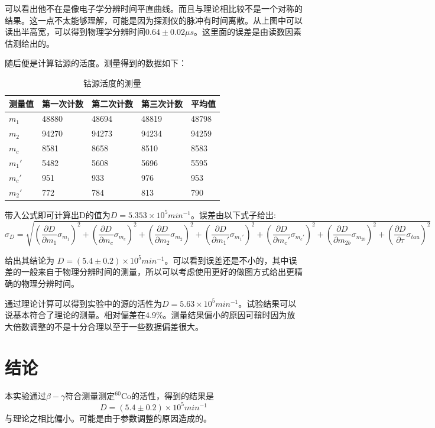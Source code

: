 \documentclass[aps,pre,12pt,preprint,onecolumn,showpacs,showkeys,UTF8]{revtex4-1}
\begin{document}
可以看出他不在是像电子学分辨时间平直曲线。而且与理论相比较不是一个对称的结果。这一点不太能够理解，可能是因为探测仪的脉冲有时间离散。从上图中可以读出半高宽，可以得到物理学分辨时间$0.64\pm 0.02\mu s$。这里面的误差是由读数因素估测给出的。

随后便是计算钴源的活度。测量得到的数据如下：
\begin{center}
	\begin{table}[h]
		\caption{钴源活度的测量}
		\begin{tabularx}{12cm}{XXXXX}
			\hline
			\hline
			测量值&第一次计数&第二次计数&第三次计数&平均值\\
			\hline	
			$m_1$&48880&48694&48819&48798\\
			$m_2$&94270&94273&94234&94259\\
			$m_c$&8581&8658&8510&8583\\
			$m_1'$&5482&5608&5696&5595\\
			$m_c'$&951&933&976&953\\
			$m_2'$&772&784&813&790\\
			\hline
			\hline
		\end{tabularx}
	\end{table}
\end{center}

带入公式即可计算出D的值为$D=5.353\times10^5 min^{-1}$。误差由以下式子给出:
\begin{equation}
	\sigma_D=\sqrt{(\frac{\partial D}{\partial m_1}\sigma_{m_1})^2+(\frac{\partial D}{\partial m_c}\sigma_{m_c})^2+(\frac{\partial D}{\partial m_2}\sigma_{m_2})^2+(\frac{\partial D}{\partial m_1'}\sigma_{m_1'})^2+(\frac{\partial D}{\partial m_c'}\sigma_{m_c'})^2+(\frac{\partial D}{\partial m_{2b}}\sigma_{m_{2b}})^2+(\frac{\partial D}{\partial \tau}\sigma_{tau})^2}
\end{equation}

给出其结论为 $D=(5.4\pm0.2)\times10^5 min^{-1}$。可以看到误差还是不小的，其中误差的一般来自于物理分辨时间的测量，所以可以考虑使用更好的做图方式给出更精确的物理分辨时间。

通过理论计算可以得到实验中的源的活性为$D=5.63\times10^5 min^{-1}$。试验结果可以说基本符合了理论的测量。相对偏差在4.9\%。测量结果偏小的原因可鞥时因为放大倍数调整的不是十分合理以至于一些数据偏差很大。

\section{结论}

本实验通过$\beta-\gamma$符合测量测定$^{60}$Co的活性，得到的结果是
\begin{equation}
	D=(5.4\pm0.2)\times10^5 min^{-1}
\end{equation}
与理论之相比偏小。可能是由于参数调整的原因造成的。
\end{document}
